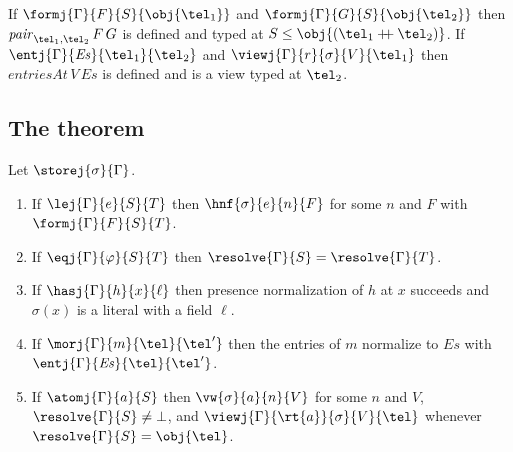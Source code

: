 \begin{lemma}\label{lem:pair-apply}
If $\formj{\Gamma}{F}{S}{\obj{\tel_1}}$ and $\formj{\Gamma}{G}{S}{\obj{\tel_2}}$ then $\mathit{pair}_{\tel_1,\tel_2}\,F\,G$ is defined and typed at $S \le \obj{(\tel_1 \mathbin{+\!\!+} \tel_2)}$. If $\entj{\Gamma}{\mathit{Es}}{\tel_1}{\tel_2}$ and $\viewj{\Gamma}{r}{\sigma}{V}{\tel_1}$ then $\mathit{entriesAt}\,V\,\mathit{Es}$ is defined and is a view typed at $\tel_2$.
\end{lemma}

\subsection{The theorem}

\begin{theorem}\label{thm:canon}
Let $\storej{\sigma}{\Gamma}$.
\begin{enumerate}
\item If $\lej{\Gamma}{e}{S}{T}$ then $\hnf{\sigma}{e}{n}{F}$ for some $n$ and $F$ with $\formj{\Gamma}{F}{S}{T}$.
\item If $\eqj{\Gamma}{\varphi}{S}{T}$ then $\resolve{\Gamma}{S} = \resolve{\Gamma}{T}$.
\item If $\hasj{\Gamma}{h}{x}{\ell}$ then presence normalization of $h$ at $x$ succeeds and $\sigma(x)$ is a literal with a field $\ell$.
\item If $\morj{\Gamma}{m}{\tel}{\tel'}$ then the entries of $m$ normalize to $\mathit{Es}$ with $\entj{\Gamma}{\mathit{Es}}{\tel}{\tel'}$.
\item If $\atomj{\Gamma}{a}{S}$ then $\vw{\sigma}{a}{n}{V}$ for some $n$ and $V$, $\resolve{\Gamma}{S} \neq \bot$, and $\viewj{\Gamma}{\rt{a}}{\sigma}{V}{\tel}$ whenever $\resolve{\Gamma}{S} = \obj{\tel}$.
\end{enumerate}
\end{theorem}

